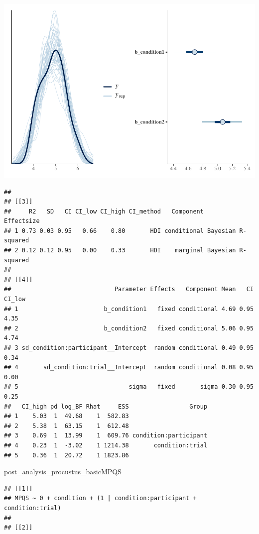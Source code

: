 \documentclass[
]{article}
\newenvironment{Shaded}{\begin{snugshade}}{\end{snugshade}}
\newcommand{\NormalTok}[1]{#1}
\begin{document}
\includegraphics{06_Publish_GUSO_ASIL_files/figure-latex/DiagnosticsQ-1.pdf}

\begin{verbatim}
## 
## [[3]]
##     R2   SD   CI CI_low CI_high CI_method   Component         Effectsize
## 1 0.73 0.03 0.95   0.66    0.80       HDI conditional Bayesian R-squared
## 2 0.12 0.12 0.95   0.00    0.33       HDI    marginal Bayesian R-squared
## 
## [[4]]
##                             Parameter Effects   Component Mean   CI CI_low
## 1                        b_condition1   fixed conditional 4.69 0.95   4.35
## 2                        b_condition2   fixed conditional 5.06 0.95   4.74
## 3 sd_condition:participant__Intercept  random conditional 0.49 0.95   0.34
## 4       sd_condition:trial__Intercept  random conditional 0.08 0.95   0.00
## 5                               sigma   fixed       sigma 0.30 0.95   0.25
##   CI_high pd log_BF Rhat     ESS                 Group
## 1    5.03  1  49.68    1  582.83                      
## 2    5.38  1  63.15    1  612.48                      
## 3    0.69  1  13.99    1  609.76 condition:participant
## 4    0.23  1  -3.02    1 1214.38       condition:trial
## 5    0.36  1  20.72    1 1823.86
\end{verbatim}

\begin{Shaded}
\begin{Highlighting}[]
\NormalTok{post\_analysis\_procustus\_basicMPQS}
\end{Highlighting}
\end{Shaded}

\begin{verbatim}
## [[1]]
## MPQS ~ 0 + condition + (1 | condition:participant + condition:trial) 
## 
## [[2]]
\end{verbatim}
\end{document}
